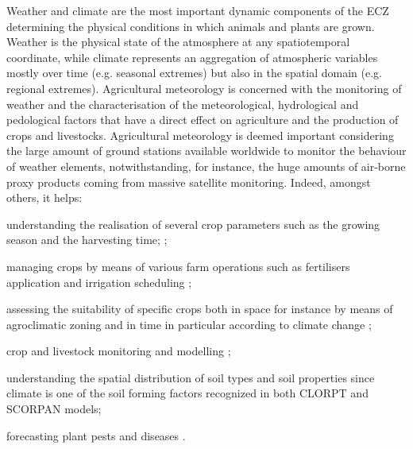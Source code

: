 \documentclass[authoryear,preprint,review,12pt]{elsarticle}
\begin{document}

Weather and climate are the most important dynamic components of the ECZ determining the physical conditions in which animals and plants are grown.
Weather is the physical state of the atmosphere at any spatiotemporal coordinate, while climate represents an aggregation of atmospheric variables mostly over time (e.g. seasonal extremes) but also in the spatial domain (e.g. regional extremes).
Agricultural meteorology is concerned with the monitoring of weather and the characterisation of the meteorological, hydrological and pedological factors that have a direct effect on agriculture and the production of crops and livestocks.
Agricultural meteorology is deemed important considering the large amount of ground stations available worldwide to monitor the behaviour of weather elements, notwithstanding, for instance, the huge amounts of air-borne proxy products coming from massive satellite monitoring.
Indeed, amongst others, it helps: 
    \begin{enumerate*}
        \item understanding the realisation of several crop parameters such as the growing season and the harvesting time;  \citep{Hoogenboom:agrometeo-swat:2000,Chou2019,Madhukar2021,Richmond2022};
        \item managing crops by means of various farm operations such as fertilisers application and irrigation scheduling \citep{Cammarano2021,Chen2020};
        \item assessing the suitability of specific crops both in space for instance by means of agroclimatic zoning and in time in particular according to climate change \citep{Rokochynskiy2020,Jiang2020};
        \item crop and livestock monitoring and modelling \citep{Vogel2021,Zhang2022};
        \item understanding the spatial distribution of soil types and soil properties since climate is one of the soil forming factors recognized in both CLORPT \citep{jenny:clorpt:1941} and SCORPAN \citep{McBratney:scorpan:2003} models;
        \item forecasting plant pests and diseases \citep{IPM_decisions}.
    \end{enumerate*}
\end{document}
